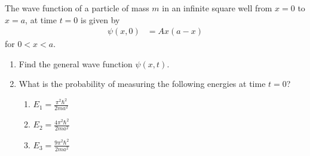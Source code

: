 \documentclass[titlepage, fleqn, a4paper, 12pt, twoside]{article}
\theoremstyle{definition}
\theoremstyle{theorem}
\begin{document}
\begin{question}
	The wave function of a particle of mass $m$ in an infinite square well from $x = 0$ to $x = a$, at time $t = 0$ is given by
	\begin{align*}
		\psi(x,0) &= A x (a - x)
	\end{align*}
	for $0 < x < a$.\\
	\begin{enumerate}
		\item
			Find the general wave function $\psi(x,t)$.
		\item
			What is the probability of measuring the following energies at time $t = 0$?
			\begin{enumerate}
				\item $E_1 = \frac{\pi^2 \hbar^2}{2 m a^2}$
				\item $E_2 = \frac{4 \pi^2 \hbar^2}{2 m a^2}$
				\item $E_3 = \frac{9 \pi^2 \hbar^2}{2 m a^2}$
			\end{enumerate}
	\end{enumerate}
\end{question}
\end{document}
